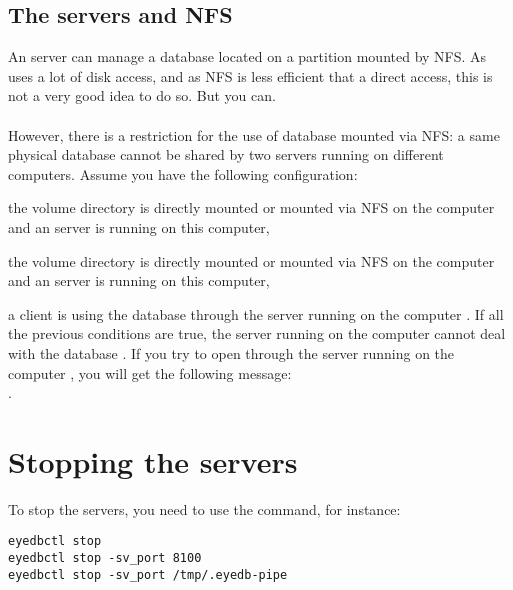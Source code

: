 \subsection{The servers and NFS}
An \eyedb server can manage a database located on a partition mounted by NFS.
As \eyedb uses a lot of disk access, and as NFS is less efficient that
a direct access, this is not a very good idea to do so. But you can.
\\
\\
However, there is a restriction for the use of database mounted via NFS:
a same physical database cannot be shared by two servers running on
different computers. Assume you have the following configuration:
\be
\item the \eyedb volume directory  is directly mounted or mounted via NFS
on the computer  and an \eyedb server is running on this computer,
\item the \eyedb volume directory  is directly mounted or mounted via NFS
on the computer  and an \eyedb server is running on this computer,
\item a client is using the database  through the
\eyedb server running on the computer .
\ee
If all the previous conditions are true, the server running on
the computer  cannot deal with the database .
If you try to open  through the server running on the
computer , you will get the following message:\\
.

\section{Stopping the servers}
To stop the \eyedb servers, you need to use the 
command, for instance:
{\verbsize\begin{verbatim}
eyedbctl stop
eyedbctl stop -sv_port 8100
eyedbctl stop -sv_port /tmp/.eyedb-pipe
\end{verbatim}}
